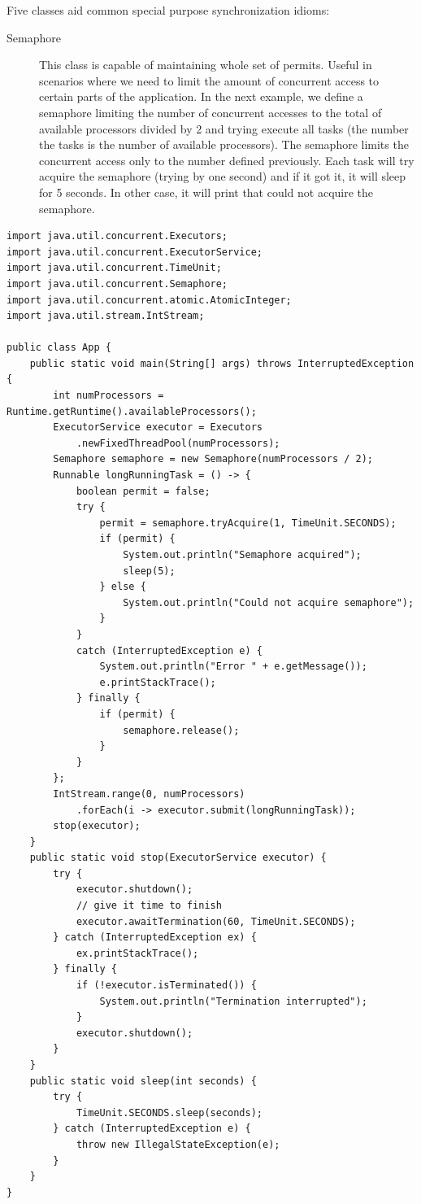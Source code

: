 \documentclass{latex/classes/thesis}
\begin{document}
Five classes aid common special purpose synchronization idioms:

\begin{description}
\item[{Semaphore}] This class is capable of maintaining whole set of
permits. Useful in scenarios where we need to limit the amount of
concurrent access to certain parts of the application. In the next example,
we define a semaphore limiting the number of concurrent accesses to the
total of available processors divided by 2 and trying execute all tasks
(the number the tasks is the number of available processors). The semaphore
limits the concurrent access only to the number defined previously. Each
task will try acquire the semaphore (trying by one second) and if it got
it, it will sleep for 5 seconds. In other case, it will print that could
not acquire the semaphore.
\end{description}

\begin{lstlisting}
import java.util.concurrent.Executors;
import java.util.concurrent.ExecutorService;
import java.util.concurrent.TimeUnit;
import java.util.concurrent.Semaphore;
import java.util.concurrent.atomic.AtomicInteger;
import java.util.stream.IntStream;

public class App {
    public static void main(String[] args) throws InterruptedException {
        int numProcessors = Runtime.getRuntime().availableProcessors();
        ExecutorService executor = Executors
            .newFixedThreadPool(numProcessors);
        Semaphore semaphore = new Semaphore(numProcessors / 2);
        Runnable longRunningTask = () -> {
            boolean permit = false;
            try {
                permit = semaphore.tryAcquire(1, TimeUnit.SECONDS);
                if (permit) {
                    System.out.println("Semaphore acquired");
                    sleep(5);
                } else {
                    System.out.println("Could not acquire semaphore");
                }
            }
            catch (InterruptedException e) {
                System.out.println("Error " + e.getMessage());
                e.printStackTrace();
            } finally {
                if (permit) {
                    semaphore.release();
                }
            }
        };
        IntStream.range(0, numProcessors)
            .forEach(i -> executor.submit(longRunningTask));
        stop(executor);
    }
    public static void stop(ExecutorService executor) {
        try {
            executor.shutdown();
            // give it time to finish
            executor.awaitTermination(60, TimeUnit.SECONDS);
        } catch (InterruptedException ex) {
            ex.printStackTrace();
        } finally {
            if (!executor.isTerminated()) {
                System.out.println("Termination interrupted");
            }
            executor.shutdown();
        }
    }
    public static void sleep(int seconds) {
        try {
            TimeUnit.SECONDS.sleep(seconds);
        } catch (InterruptedException e) {
            throw new IllegalStateException(e);
        }
    }
}
\end{lstlisting}
\end{document}
